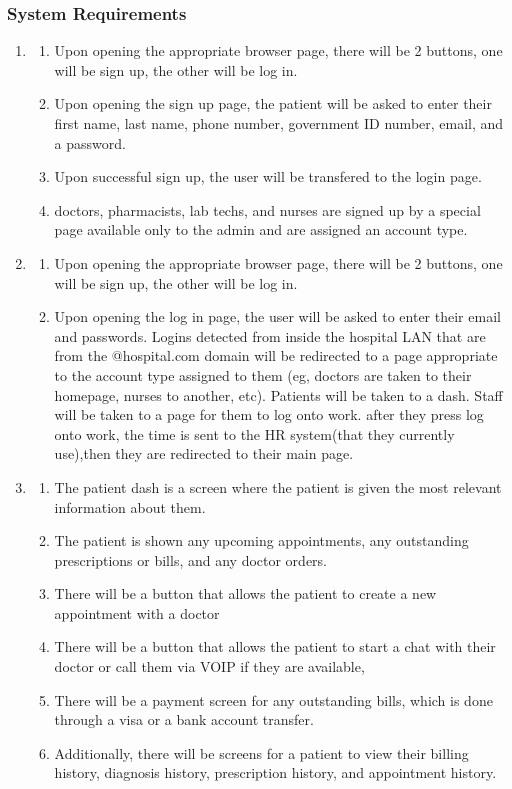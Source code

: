 \documentclass[14pt]{article}
\begin{document}
\subsubsection{System Requirements}
\begin{enumerate}
	\item \begin{enumerate}
			\item Upon opening the appropriate browser page, there will be 2 buttons, one will be sign up, the other will be log in.
			\item Upon opening the sign up page, the patient will be asked to enter their first name, last name, phone number,
			government ID number, email, and a password.
			\item Upon successful sign up, the user will be transfered to the login page.
			\item doctors, pharmacists, lab techs, and nurses are signed up by a special page available only to the admin and are assigned
			an account type.
			\end{enumerate}
	\item \begin{enumerate}
			\item Upon opening the appropriate browser page, there will be 2 buttons, one will be sign up, the other will be log in.
			\item Upon opening the log in page, the user will be asked to enter their email and passwords. Logins detected from 
			inside the hospital LAN that are from the @hospital.com domain will be redirected to a page appropriate to the account type
			assigned to them (eg, doctors are taken to their homepage, nurses to another, etc). Patients will be taken to a dash. Staff will 
			be taken to a page for them to log onto work. after they press log onto work,
			the time is sent to the HR system(that they currently use),then they are redirected to their main page.
		  \end{enumerate}
		  
	\item \begin{enumerate}
			\item The patient dash is a screen where the patient is given the most relevant information about them.
			\item The patient is shown any upcoming appointments, any outstanding prescriptions or bills, and any doctor orders.
			\item There will be a button that allows the patient to create a new appointment with a doctor
			\item There will be a button that allows the patient to start a chat with their doctor or call them via VOIP if they are 
			available, 
			\item There will be a payment screen for any outstanding bills, which is done through a visa or a bank account transfer. 
			\item Additionally, there will be screens for a patient to view their billing history, diagnosis history, prescription history,
			and appointment history.
		  \end{enumerate}
		  

\end{enumerate}
\end{document}
